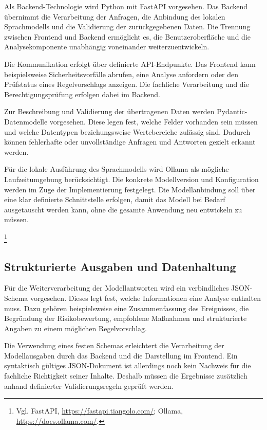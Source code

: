 Als Backend-Technologie wird Python mit FastAPI vorgesehen.
Das Backend übernimmt die Verarbeitung der Anfragen, die
Anbindung des lokalen Sprachmodells und die Validierung der
zurückgegebenen Daten. Die Trennung zwischen Frontend und
Backend ermöglicht es, die Benutzeroberfläche und die
Analysekomponente unabhängig voneinander weiterzuentwickeln.

Die Kommunikation erfolgt über definierte API-Endpunkte.
Das Frontend kann beispielsweise Sicherheitsvorfälle abrufen,
eine Analyse anfordern oder den Prüfstatus eines Regelvorschlags
anzeigen. Die fachliche Verarbeitung und die Berechtigungsprüfung
erfolgen dabei im Backend.

Zur Beschreibung und Validierung der übertragenen Daten werden
Pydantic-Datenmodelle vorgesehen. Diese legen fest, welche Felder
vorhanden sein müssen und welche Datentypen beziehungsweise
Wertebereiche zulässig sind. Dadurch können fehlerhafte oder
unvollständige Anfragen und Antworten gezielt erkannt werden.

Für die lokale Ausführung des Sprachmodells wird Ollama als
mögliche Laufzeitumgebung berücksichtigt. Die konkrete
Modellversion und Konfiguration werden im Zuge der Implementierung
festgelegt. Die Modellanbindung soll über eine klar definierte
Schnittstelle erfolgen, damit das Modell bei Bedarf ausgetauscht
werden kann, ohne die gesamte Anwendung neu entwickeln zu müssen.

\footnote{Vgl. FastAPI, \url{https://fastapi.tiangolo.com/};
Ollama, \url{https://docs.ollama.com/}.}

\subsection{Strukturierte Ausgaben und Datenhaltung}

Für die Weiterverarbeitung der Modellantworten wird ein
verbindliches JSON-Schema vorgesehen. Dieses legt fest, welche
Informationen eine Analyse enthalten muss. Dazu gehören
beispielsweise eine Zusammenfassung des Ereignisses, die
Begründung der Risikobewertung, empfohlene Maßnahmen und
strukturierte Angaben zu einem möglichen Regelvorschlag.

Die Verwendung eines festen Schemas erleichtert die Verarbeitung
der Modellausgaben durch das Backend und die Darstellung im
Frontend. Ein syntaktisch gültiges JSON-Dokument ist allerdings
noch kein Nachweis für die fachliche Richtigkeit seiner Inhalte.
Deshalb müssen die Ergebnisse zusätzlich anhand definierter
Validierungsregeln geprüft werden.

